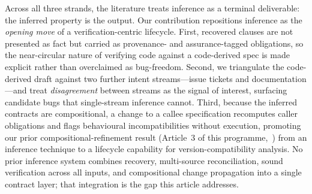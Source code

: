 Across all three strands, the literature treats inference as a terminal deliverable: the inferred property is the output. Our contribution repositions inference as the \emph{opening move} of a verification-centric lifecycle. First, recovered clauses are not presented as fact but carried as provenance- and assurance-tagged obligations, so the near-circular nature of verifying code against a code-derived spec is made explicit rather than overclaimed as bug-freedom. Second, we triangulate the code-derived draft against two further intent streams---issue tickets and documentation---and treat \emph{disagreement} between streams as the signal of interest, surfacing candidate bugs that single-stream inference cannot. Third, because the inferred contracts are compositional, a change to a callee specification recomputes caller obligations and flags behavioural incompatibilities without execution, promoting our prior compositional-refinement result (Article~3 of this programme,~\cite{edmonds_article3}) from an inference technique to a lifecycle capability for version-compatibility analysis. No prior inference system combines recovery, multi-source reconciliation, sound verification across all inputs, and compositional change propagation into a single contract layer; that integration is the gap this article addresses.
